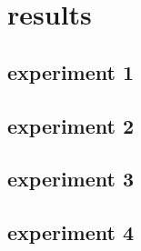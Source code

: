 \chapter{results}

\section{experiment 1}
\section{experiment 2}
\section{experiment 3}
\section{experiment 4}
